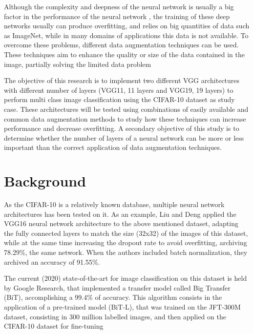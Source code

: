 \documentclass[10pt,twocolumn,letterpaper]{article}
\begin{document}
Although the complexity and deepness of the neural network is usually a big factor in the performance of the neural network \cite{He2016}, the training of these deep networks usually can produce overfitting, and relies on big quantities of data such as ImageNet, while in many domains of applications this data is not available. To overcome these problems, different data augmentation techniques can be used. These techniques aim to enhance the quality or size of the data contained in the image, partially solving the limited data problem \cite{Shorten2019}

The objective of this research is to implement two different VGG architectures with different number of layers (VGG11, 11 layers and VGG19, 19 layers) to perform multi class image classification using the CIFAR-10 dataset as study case. These architectures will be tested using combinations of easily available and common data augmentation methods to study how these techniques can increase performance and decrease overfitting. A secondary objective of this study is to determine whether the number of layers of a neural network can be more or less important than the correct application of data augmentation techniques.


\section{Background}

As the CIFAR-10 is a relatively known database, multiple neural network architectures has been tested on it. As an example, Liu and Deng \cite{Liu2016} applied the VGG16 neural network architecture to the above mentioned dataset, adapting the fully connected layers to match the size (32x32) of the images of this dataset, while at the same time increasing the dropout rate to avoid overfitting, archiving 78.29\%, the same network. When the authors included batch normalization, they archived an accuracy of 91.55\%.

The current (2020) state-of-the-art for image classification on this dataset is held by Google Research, that implemented a transfer model called Big Transfer (BiT), accomplishing a 99.4\% of accuracy. This algorithm consists in the application of a pre-trained model (BiT-L), that was trained on the JFT-300M dataset, consisting in 300 million labelled images, and then applied on the CIFAR-10 dataset for fine-tuning \cite{Kolesnikov2019}
\end{document}
